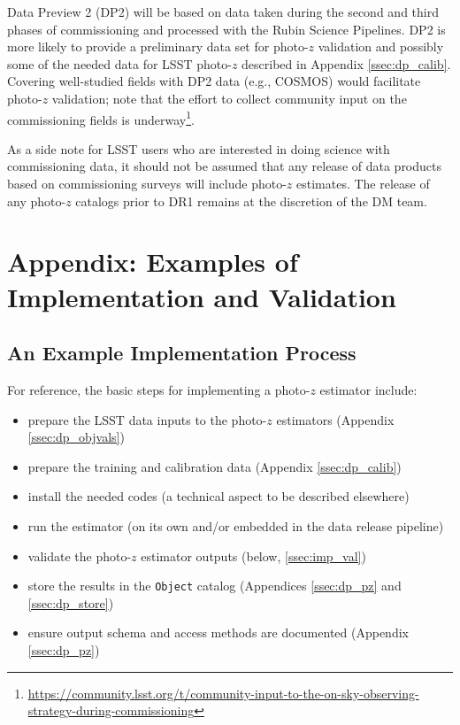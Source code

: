 \documentclass[DM,authoryear,toc]{lsstdoc}
\begin{document}
\begin{enumerate}
Data Preview 2 (DP2) will be based on data taken during the second and third phases of commissioning and processed with the Rubin Science Pipelines. 
DP2 is more likely to provide a preliminary data set for photo-$z$ validation and possibly some of the needed data for LSST photo-$z$ described in Appendix \ref{ssec:dp_calib}. 
Covering well-studied fields with DP2 data (e.g., COSMOS) would facilitate photo-$z$ validation; note that the effort to collect community input on the commissioning fields is underway\footnote{\url{https://community.lsst.org/t/community-input-to-the-on-sky-observing-strategy-during-commissioning}}.

As a side note for LSST users who are interested in doing science with commissioning data, it should not be assumed that any release of data products based on commissioning surveys will include photo-$z$ estimates.
The release of any photo-$z$ catalogs prior to DR1 remains at the discretion of the DM team.



\clearpage
\appendix 

\section{Appendix: Examples of Implementation and Validation}\label{sec:imp}

\subsection{An Example Implementation Process}\label{ssec:imp_imp}

For reference, the basic steps for implementing a photo-$z$ estimator include:
\vspace{-15pt}
\begin{itemize}
\item prepare the LSST data inputs to the photo-$z$ estimators (Appendix \ref{ssec:dp_objvals})
\item prepare the training and calibration data (Appendix \ref{ssec:dp_calib})
\item install the needed codes (a technical aspect to be described elsewhere)
\item run the estimator (on its own and/or embedded in the data release pipeline)
\item validate the photo-$z$ estimator outputs (below, \ref{ssec:imp_val})
\item store the results in the {\tt Object} catalog (Appendices \ref{ssec:dp_pz} and \ref{ssec:dp_store})
\item ensure output schema and access methods are documented (Appendix \ref{ssec:dp_pz})
\end{itemize}


\end{enumerate}
\end{document}
